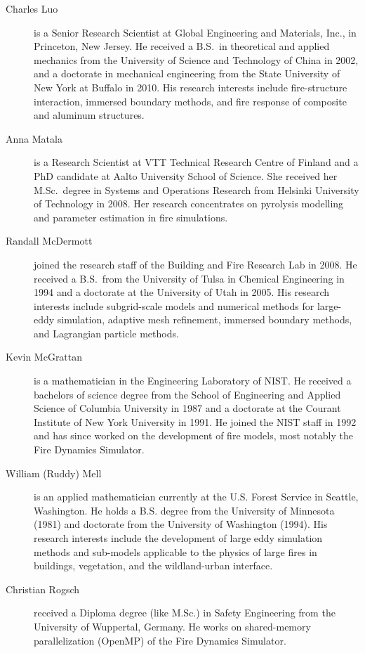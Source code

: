 \begin{description}
\item[Charles Luo] is a Senior Research Scientist at Global Engineering and Materials, Inc., in Princeton, New Jersey. He received a B.S.~in theoretical and applied mechanics from the University of Science and Technology of China in 2002, and a doctorate in mechanical engineering from the State University of New York at Buffalo in 2010. His research interests include fire-structure interaction, immersed boundary methods, and fire response of composite and aluminum structures.

\item[Anna Matala] is a Research Scientist at VTT Technical Research Centre of Finland and a PhD candidate at Aalto University School of Science. She received her M.Sc.~degree in Systems and Operations Research from Helsinki University of Technology in 2008. Her research concentrates on pyrolysis modelling and parameter estimation in fire simulations.

\item[Randall McDermott] joined the research staff of the Building and Fire Research Lab in 2008. He received a B.S.~from the University of Tulsa in Chemical Engineering in 1994 and a doctorate at the University of Utah in 2005. His research interests include subgrid-scale models and numerical methods for large-eddy simulation, adaptive mesh refinement, immersed boundary methods, and Lagrangian particle methods.

\item[Kevin McGrattan] is a mathematician in the Engineering Laboratory of NIST. He received a bachelors of science degree from the School of Engineering and Applied Science of Columbia University in 1987 and a doctorate at the Courant Institute of New York University in 1991. He joined the NIST staff in 1992 and has since worked on the development of fire models, most notably the Fire Dynamics Simulator.

\item[William (Ruddy) Mell] is an applied mathematician currently at the U.S. Forest Service in Seattle, Washington. He holds a B.S. degree from the University of Minnesota (1981) and doctorate from the University of Washington (1994). His research interests include the development of large eddy simulation methods and sub-models applicable to the physics of large fires in buildings, vegetation, and the wildland-urban interface.

\item[Christian Rogsch] received a Diploma degree (like M.Sc.) in Safety Engineering from the University of Wuppertal, Germany. He works on shared-memory parallelization (OpenMP) of the Fire Dynamics Simulator.


\end{description}
